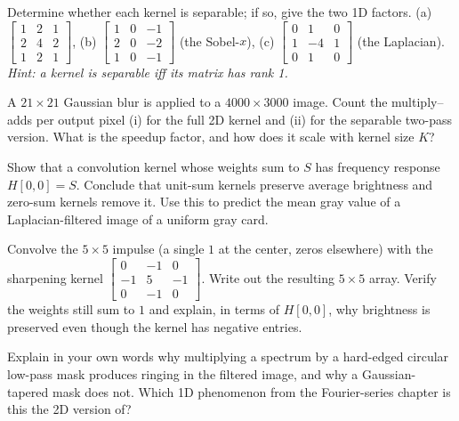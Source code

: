 \begin{exercise}
\label{ch31:ex-sep-check}
Determine whether each kernel is separable; if so, give the two 1D factors.
(a) $\begin{bmatrix}1&2&1\\2&4&2\\1&2&1\end{bmatrix}$,\quad
(b) $\begin{bmatrix}1&0&-1\\2&0&-2\\1&0&-1\end{bmatrix}$ (the Sobel-$x$),\quad
(c) $\begin{bmatrix}0&1&0\\1&-4&1\\0&1&0\end{bmatrix}$ (the Laplacian).
\emph{Hint: a kernel is separable iff its matrix has rank 1.}
\end{exercise}

\begin{exercise}
\label{ch31:ex-cost}
A $21\times21$ Gaussian blur is applied to a $4000\times3000$ image. Count the
multiply--adds per output pixel (i) for the full 2D kernel and (ii) for the
separable two-pass version. What is the speedup factor, and how does it scale with
kernel size $K$?
\end{exercise}

\begin{exercise}
\label{ch31:ex-dcsum}
Show that a convolution kernel whose weights sum to $S$ has frequency response
$H[0,0]=S$. Conclude that unit-sum kernels preserve average brightness and
zero-sum kernels remove it. Use this to predict the mean gray value of a
Laplacian-filtered image of a uniform gray card.
\end{exercise}

\begin{exercise}
\label{ch31:ex-impulse}
Convolve the $5\times5$ impulse (a single $1$ at the center, zeros elsewhere) with
the sharpening kernel $\begin{bmatrix}0&-1&0\\-1&5&-1\\0&-1&0\end{bmatrix}$. Write
out the resulting $5\times5$ array. Verify the weights still sum to $1$ and explain,
in terms of $H[0,0]$, why brightness is preserved even though the kernel has
negative entries.
\end{exercise}

\begin{exercise}
\label{ch31:ex-ring}
Explain in your own words why multiplying a spectrum by a hard-edged circular
low-pass mask produces ringing in the filtered image, and why a Gaussian-tapered
mask does not. Which 1D phenomenon from the Fourier-series chapter is this the
2D version of?
\end{exercise}

